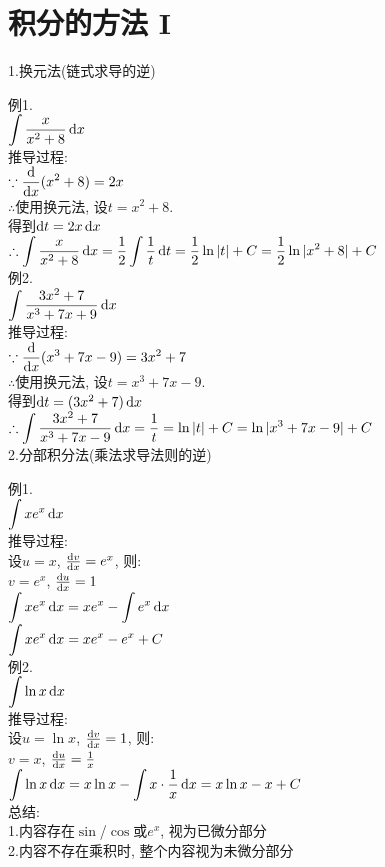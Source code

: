 \chapter{积分的方法 I}
1.换元法(链式求导的逆)
{\par\centering
{}
\par}
例1.\\[1ex]
$\displaystyle\int\frac{x}{x^2+8}\mathop{}\!\mathrm{d} x$\\[1ex]
推导过程:\\[1ex]
$\displaystyle\because\frac{\mathop{}\!\mathrm{d}}{\mathop{}\!\mathrm{d} x}(x^2+8)=2x$\\[1ex]
$\therefore$使用换元法, 设$t=x^2+8$.\\[1ex]
\phantom{$\therefore$}得到$\mathop{}\!\mathrm{d} t=2x\mathop{}\!\mathrm{d} x$\\[1ex]
$\therefore\displaystyle\int\frac{x}{x^2+8}\mathop{}\!\mathrm{d} x=\frac{1}{2}\int\frac{1}{t}\mathop{}\!\mathrm{d} t=\frac{1}{2}\ln|t|+C=\frac{1}{2}\ln|x^2+8|+C$\\[2ex]

例2.\\[1ex]
$\displaystyle\int\frac{3x^2+7}{x^3+7x+9}\mathop{}\!\mathrm{d} x$\\[1ex]
推导过程:\\[1ex]
$\displaystyle\because\frac{\mathop{}\!\mathrm{d}}{\mathop{}\!\mathrm{d} x}(x^3+7x-9)=3x^2+7$\\[1ex]
$\therefore$使用换元法, 设$t=x^3+7x-9$.\\[1ex]
\phantom{$\therefore$}得到$\mathop{}\!\mathrm{d} t=(3x^2+7)\mathop{}\!\mathrm{d} x$\\[1ex]
$\therefore\displaystyle\int\frac{3x^2+7}{x^3+7x-9}\mathop{}\!\mathrm{d} x=\frac{1}{t}=\ln|t|+C=\ln|x^3+7x-9|+C$\\[2ex]

2.分部积分法(乘法求导法则的逆)
{\par\centering
{}
\par}
例1.\\[1ex]
$\displaystyle\int xe^x\mathop{}\!\mathrm{d} x$\\[1ex]
推导过程:\\[1ex]
设$u=x$, $\frac{\mathop{}\!\mathrm{d} v}{\mathop{}\!\mathrm{d} x}=e^x$, 则:\\[1ex]
\phantom{设}$v=e^x$, $\frac{\mathop{}\!\mathrm{d} u}{\mathop{}\!\mathrm{d} x}=1$\\[1ex]
$\displaystyle\int xe^x\mathop{}\!\mathrm{d} x=xe^x-\int e^x\mathop{}\!\mathrm{d} x$\\[1ex]
$\displaystyle\int xe^x\mathop{}\!\mathrm{d} x=xe^x-e^x+C$\\[2ex]

例2.\\[1ex]
$\displaystyle\int\ln x\mathop{}\!\mathrm{d} x$\\[1ex]
推导过程:\\[1ex]
设$u=\ln x$, $\frac{\mathop{}\!\mathrm{d} v}{\mathop{}\!\mathrm{d} x}=1$, 则:\\[1ex]
\phantom{设}$v=x$, $\frac{\mathop{}\!\mathrm{d} u}{\mathop{}\!\mathrm{d} x}=\frac{1}{x}$\\[1ex]
$\displaystyle\int\ln x\mathop{}\!\mathrm{d} x=x\ln x-\int x\cdot\frac{1}{x}\mathop{}\!\mathrm{d} x=x\ln x-x+C$\\[1ex]
总结:\\[1ex]
1.内容存在$\sin$/$\cos$或$e^x$, 视为已微分部分\\[1ex]
2.内容不存在乘积时, 整个内容视为未微分部分\\[75ex]

